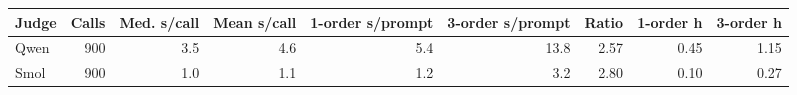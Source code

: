 

\footnotesize
\begin{tabular*}{\textwidth}{@{\extracolsep{\fill}}lrrrrrrrr}
\toprule
Judge & Calls & Med. s/call & Mean s/call & 1-order s/prompt & 3-order s/prompt & Ratio & 1-order h & 3-order h\\
\midrule
Qwen & 900 & 3.5 & 4.6 & 5.4 & 13.8 & 2.57 & 0.45 & 1.15\\
Smol & 900 & 1.0 & 1.1 & 1.2 & 3.2 & 2.80 & 0.10 & 0.27\\
\bottomrule
\end{tabular*}

